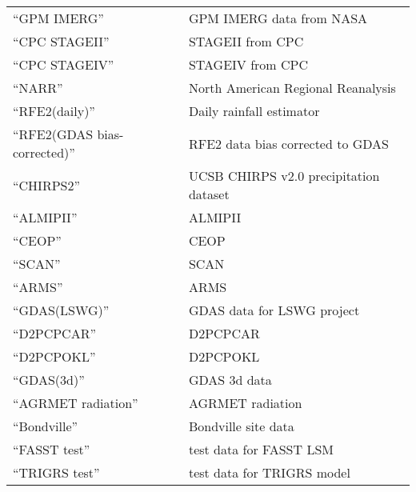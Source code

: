 \begin{tabular}{ll}
 ``GPM IMERG''                 & GPM IMERG data from NASA           \\
 
 ``CPC STAGEII''               & STAGEII from CPC                   \\
 ``CPC STAGEIV''               & STAGEIV from CPC                   \\
 ``NARR''                      & North American Regional Reanalysis \\
 ``RFE2(daily)''               & Daily rainfall estimator           \\
 ``RFE2(GDAS bias-corrected)'' & RFE2 data bias corrected to GDAS   \\
 
 ``CHIRPS2''                   & UCSB CHIRPS v2.0 precipitation dataset \\
 
 
 ``ALMIPII''                   & ALMIPII                            \\
 
 ``CEOP''                      & CEOP                               \\
 ``SCAN''                      & SCAN                               \\
 
 ``ARMS''                      & ARMS                               \\
 
 ``GDAS(LSWG)''                & GDAS data for LSWG project         \\
 
 ``D2PCPCAR''                  & D2PCPCAR                           \\
 ``D2PCPOKL''                  & D2PCPOKL                           \\
 ``GDAS(3d)''                  & GDAS 3d data                       \\
 
 ``AGRMET radiation''          & AGRMET radiation                   \\
 ``Bondville''                 & Bondville site data                \\
 
 ``FASST test''                & test data for FASST LSM            \\
 ``TRIGRS test''               & test data for TRIGRS model         \\
 

\end{tabular}
